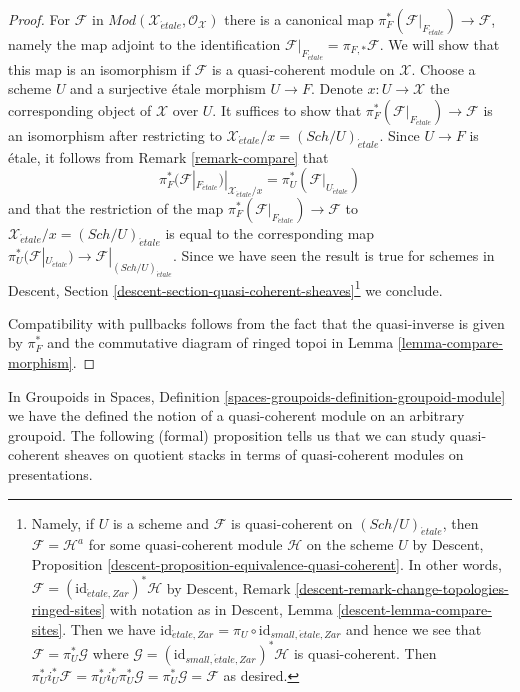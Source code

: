 \documentclass{stacks-project}
\theoremstyle{plain}
\theoremstyle{definition}
\theoremstyle{remark}
\numberwithin{equation}{subsection}
\def\Sch{\mathit{Sch}}
\def\etale{{\acute{e}tale}}
\begin{document}
\begin{proof}
\medskip\noindent
For $\mathcal{F}$ in
$\textit{Mod}(\mathcal{X}_\etale, \mathcal{O}_\mathcal{X})$
there is a canonical map $\pi_F^*(\mathcal{F}|_{F_\etale}) \to \mathcal{F}$,
namely the map adjoint to the identification
$\mathcal{F}|_{F_\etale} = \pi_{F, *}\mathcal{F}$.
We will show that this map is an isomorphism if $\mathcal{F}$ is
a quasi-coherent module on $\mathcal{X}$.
Choose a scheme $U$ and a surjective \'etale morphism $U \to F$.
Denote $x : U \to \mathcal{X}$ the corresponding object of $\mathcal{X}$
over $U$. It suffices to show that
$\pi_F^*(\mathcal{F}|_{F_\etale}) \to \mathcal{F}$ is an isomorphism
after restricting to $\mathcal{X}_\etale/x = (\Sch/U)_\etale$.
Since $U \to F$ is \'etale, it follows from Remark \ref{remark-compare} that
$$
\pi_F^*(\mathcal{F}|_{F_\etale})|_{\mathcal{X}_\etale/x} =
\pi_U^*(\mathcal{F}|_{U_\etale})
$$
and that the restriction of the map
$\pi_F^*(\mathcal{F}|_{F_\etale}) \to \mathcal{F}$
to $\mathcal{X}_\etale/x = (\Sch/U)_\etale$
is equal to the corresponding map
$\pi_U^*(\mathcal{F}|_{U_\etale}) \to \mathcal{F}|_{(\Sch/U)_\etale}$.
Since we have seen the result is true for schemes in
Descent, Section \ref{descent-section-quasi-coherent-sheaves}\footnote{Namely,
if $U$ is a scheme and $\mathcal{F}$ is quasi-coherent on
$(\Sch/U)_\etale$, then $\mathcal{F} = \mathcal{H}^a$ for some
quasi-coherent module $\mathcal{H}$ on the scheme $U$ by
Descent, Proposition \ref{descent-proposition-equivalence-quasi-coherent}.
In other words, $\mathcal{F} = (\text{id}_{\etale,Zar})^*\mathcal{H}$
by Descent, Remark \ref{descent-remark-change-topologies-ringed-sites}
with notation as in Descent, Lemma \ref{descent-lemma-compare-sites}.
Then we have
$\text{id}_{\etale,Zar} = \pi_U \circ \text{id}_{small,\etale,Zar}$
and hence we see that $\mathcal{F} = \pi_U^*\mathcal{G}$ where
$\mathcal{G} = (\text{id}_{small,\etale,Zar})^*\mathcal{H}$ is
quasi-coherent. Then
$\pi_U^*i_U^*\mathcal{F} = \pi_U^*i_U^*\pi_U^*\mathcal{G} =
\pi_U^*\mathcal{G} = \mathcal{F}$ as desired.}
we conclude.

\medskip\noindent
Compatibility with pullbacks follows from the fact that
the quasi-inverse is given by $\pi_F^*$ and the
commutative diagram of ringed topoi in
Lemma \ref{lemma-compare-morphism}.
\end{proof}

\noindent
In
Groupoids in Spaces, Definition
\ref{spaces-groupoids-definition-groupoid-module}
we have the defined the notion of a quasi-coherent module
on an arbitrary groupoid. The following (formal) proposition tells us
that we can study quasi-coherent sheaves on quotient stacks in
terms of quasi-coherent modules on presentations.
\end{document}
